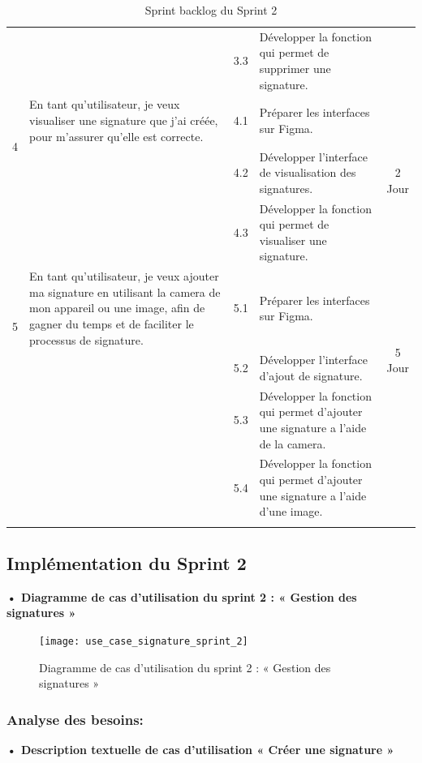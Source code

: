 \begin{adjustwidth}{-1cm}{}
\begin{longtable}{|c|p{6cm}|c|p{6cm}|c|}
      \cline{3-4}
      & & 3.3 & Développer la fonction qui permet de supprimer une signature. & \\
      \cline{1-5}
      \multirow{2}{*}{4} & En tant qu'utilisateur, je veux visualiser une signature que j'ai créée, pour m'assurer qu'elle est correcte. & 4.1 & Préparer les interfaces sur Figma. & \multirow{3}{*}{2 Jour} \\
      \cline{3-4}
      & & 4.2 & Développer l'interface de visualisation des signatures. & \\
      \cline{3-4}
      & & 4.3 & Développer la fonction qui permet de visualiser une signature. & \\
      \cline{1-5}
      \multirow{2}{*}{5} & En tant qu'utilisateur, je veux ajouter ma signature en utilisant la camera de mon appareil ou une image, afin de gagner du temps et de faciliter le processus de signature. & 5.1 & Préparer les interfaces sur Figma. & \multirow{3}{*}{5 Jour} \\
      \cline{3-4}
      & & 5.2 & Développer l'interface d'ajout de signature. & \\
      \cline{3-4}
      & & 5.3 & Développer la fonction qui permet d'ajouter une signature a l'aide de la camera. & \\
      \cline{3-4}
      & & 5.4 & Développer la fonction qui permet d'ajouter une signature a l'aide d'une image. & \\
      \cline{1-5}

  \hline
  \caption{Sprint backlog du Sprint 2}
  \label{tab:sprint-backlog-2}
\end{longtable}
\end{adjustwidth}

\subsection{Implémentation du Sprint 2}
\textbf{•	Diagramme de cas d'utilisation du sprint 2 : « Gestion des signatures »}

\begin{figure}[H]
  \centering
  \texttt{[image: use\_case\_signature\_sprint\_2]}
  \caption{Diagramme de cas d'utilisation du sprint 2 : « Gestion des signatures »}
  \label{fig:UseCaseDiagram}
\end{figure}

\subsubsection{Analyse des besoins:}
\textbf{•	Description textuelle de cas d'utilisation « Créer une signature »}

